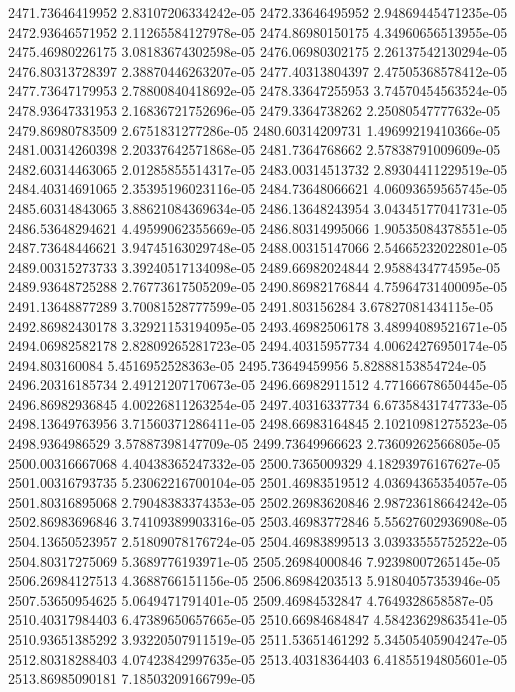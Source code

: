 {2471.73646419952 2.83107206334242e-05
2472.33646495952 2.94869445471235e-05
2472.93646571952 2.11265584127978e-05
2474.86980150175 4.34960656513955e-05
2475.46980226175 3.08183674302598e-05
2476.06980302175 2.26137542130294e-05
2476.80313728397 2.38870446263207e-05
2477.40313804397 2.47505368578412e-05
2477.73647179953 2.78800840418692e-05
2478.33647255953 3.74570454563524e-05
2478.93647331953 2.16836721752696e-05
2479.3364738262 2.25080547777632e-05
2479.86980783509 2.6751831277286e-05
2480.60314209731 1.49699219410366e-05
2481.00314260398 2.20337642571868e-05
2481.7364768662 2.57838791009609e-05
2482.60314463065 2.01285855514317e-05
2483.00314513732 2.89304411229519e-05
2484.40314691065 2.35395196023116e-05
2484.73648066621 4.06093659565745e-05
2485.60314843065 3.88621084369634e-05
2486.13648243954 3.04345177041731e-05
2486.53648294621 4.49599062355669e-05
2486.80314995066 1.90535084378551e-05
2487.73648446621 3.94745163029748e-05
2488.00315147066 2.54665232022801e-05
2489.00315273733 3.39240517134098e-05
2489.66982024844 2.9588434774595e-05
2489.93648725288 2.76773617505209e-05
2490.86982176844 4.75964731400095e-05
2491.13648877289 3.70081528777599e-05
2491.803156284 3.67827081434115e-05
2492.86982430178 3.32921153194095e-05
2493.46982506178 3.48994089521671e-05
2494.06982582178 2.82809265281723e-05
2494.40315957734 4.00624276950174e-05
2494.803160084 5.4516952528363e-05
2495.73649459956 5.82888153854724e-05
2496.20316185734 2.49121207170673e-05
2496.66982911512 4.77166678650445e-05
2496.86982936845 4.00226811263254e-05
2497.40316337734 6.67358431747733e-05
2498.13649763956 3.71560371286411e-05
2498.66983164845 2.10210981275523e-05
2498.9364986529 3.57887398147709e-05
2499.73649966623 2.73609262566805e-05
2500.00316667068 4.40438365247332e-05
2500.7365009329 4.18293976167627e-05
2501.00316793735 5.23062216700104e-05
2501.46983519512 4.03694365354057e-05
2501.80316895068 2.79048383374353e-05
2502.26983620846 2.98723618664242e-05
2502.86983696846 3.74109389903316e-05
2503.46983772846 5.55627602936908e-05
2504.13650523957 2.51809078176724e-05
2504.46983899513 3.03933555752522e-05
2504.80317275069 5.3689776193971e-05
2505.26984000846 7.92398007265145e-05
2506.26984127513 4.3688766151156e-05
2506.86984203513 5.91804057353946e-05
2507.53650954625 5.0649471791401e-05
2509.46984532847 4.7649328658587e-05
2510.40317984403 6.47389650657665e-05
2510.66984684847 4.58423629863541e-05
2510.93651385292 3.93220507911519e-05
2511.53651461292 5.34505405904247e-05
2512.80318288403 4.07423842997635e-05
2513.40318364403 6.41855194805601e-05
2513.86985090181 7.18503209166799e-05
}
